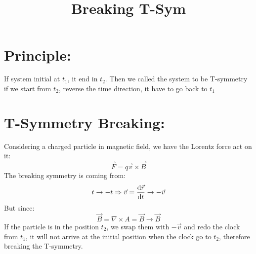 \documentclass[a4paper]{article}
\title{Breaking T-Sym}
\begin{document}
\section{Principle:}
\quad If system initial at \(t_1\), it end in \(t_2\). Then we called the system to be T-symmetry if we start from \(t_2\), reverse the time direction, it have to go back to \(t_1\)
\section{T-Symmetry Breaking:}
\quad Considering a charged particle in magnetic field, we have the Lorentz force act on it:
\begin{equation}
	\vec{F} = q \vec{v} \times \vec{B}
\end{equation}
\quad The breaking symmetry is coming from:
\begin{equation}
	t \to -t \Rightarrow \vec{v} = \dv{\vec{r}}{t} \to - \vec{v}
\end{equation}
But since:
\begin{equation}
	\vec{B} = \nabla \times A = \vec{B} \to \vec{B}
\end{equation}
If the particle is in the position \(t_2\), we swap them with \(-\vec{v}\) and redo the clock from \(t_1\), it will not arrive at the initial position when the clock go to \(t_2\), therefore breaking the T-symmetry.
\end{document}
